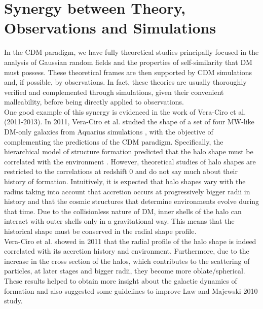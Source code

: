 \section{Synergy between Theory, Observations and Simulations }
In the CDM paradigm, we have fully theoretical studies \cite{Bardeen_1986,Schechter_1976} principally focused in the analysis of Gaussian random fields and the properties of self-similarity that DM must possess. 
These theoretical frames are then supported by CDM simulations and, if possible, by observations. 
In fact, these theories are usually thoroughly verified and complemented through simulations, given their convenient malleability, before being directly applied to observations.\\%

One good example of this synergy is evidenced in the work of Vera-Ciro et al. (2011-2013). In 2011, Vera-Ciro et al. studied the shape of a set of four MW-like DM-only galaxies from Aquarius simulations \cite{aquarius}, with the objective of complementing the predictions of the CDM paradigm. Specifically, the hierarchical model of structure formation predicted that the halo shape must be correlated with the environment \cite{Tormen_et_al._1997,Colberg_et_al._1999}. However, theoretical studies of halo shapes are restricted to the correlations at redshift 0 and do not say much about their history of formation. Intuitively, it is expected that halo shapes vary with the radius taking into account that accretion occurs at progressively bigger radii in history and that the cosmic structures that determine environments evolve during that time. Due to the collisionless nature of DM, inner shells of the halo can interact with outer shells only in a gravitational way. This means that the historical shape must be conserved in the radial shape profile.\\

Vera-Ciro et al.  showed in 2011 that the radial profile of the halo shape is indeed correlated with its accretion history and environment. Furthermore, due to the increase in the cross section of the halos, which contributes to the scattering of particles, at later stages and bigger radii, they become more oblate/spherical. These results helped to obtain more insight about the galactic dynamics of formation and also suggested some guidelines to improve Law and Majewski 2010 study.\\

